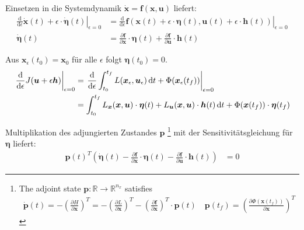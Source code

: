 \documentclass[a4paper, 12pt]{scrartcl}
\newcommand{\dt}{\thinspace \mathrm{d}t}
\begin{document}
Einsetzen in die Systemdynamik $\bm{\dot{x}}=\bm{f}(\bm{x},\bm{u})$ liefert:
%
\begin{align*}
    \left. \frac{\mathrm{d}}{\mathrm{d}\epsilon}
    \bm{\dot{x}}(t) + \epsilon \cdot \bm{\dot{\eta}}(t) \right|_{\epsilon=0}
    &=
    \left.
    \frac{\mathrm{d}}{\mathrm{d}\epsilon}
    \bm{f}
    \left(
        \bm{x}(t) + \epsilon \cdot \bm{\eta}(t),\bm{u}(t) + \epsilon \cdot \bm{h}(t)
    \right)
    \right|_{\epsilon=0}
    \\
    \bm{\dot{\eta}}(t) 
    &=
    \frac{\partial \bm{f}}{\partial \bm{x}} \cdot \bm{\eta}(t) 
    +
    \frac{\partial \bm{f}}{\partial \bm{u}} \cdot \bm{h}(t) 
\end{align*}

Aus $\bm{x}_\epsilon(t_0) = \bm{x}_0$ für alle $\epsilon$ folgt $\bm{\eta}(t_0) = 0$. 
%
\begin{align*}
    \left. 
        \frac{\mathrm{d}}{\mathrm{d}\epsilon} 
        J(\bm{u} + \epsilon \bm{h}) 
    \right|_{\epsilon=0} 
    &= 
    \left.
        \frac{\mathrm{d}}{\mathrm{d}\epsilon} 
        \int_{t_0}^{t_f} L(\bm{x}_\epsilon, \bm{u}_\epsilon) \dt + \Phi(\bm{x}_\epsilon(t_f))
    \right|_{\epsilon=0}
    \\
    &=
    \int_{t_0}^{t_f} L_{\bm{x}}(\bm{x}, \bm{u}) \cdot \bm{\eta}(t)   
    + L_{\bm{u}}(\bm{x}, \bm{u}) \cdot \bm{h}(t) \dt 
    + \Phi(\bm{x}(t_f)) \cdot \bm{\eta}(t_f)
\end{align*}

Multiplikation des adjungierten Zustandes $\bm{p}$
\footnote{
    The adjoint state $\bm{p}:\mathbb{R} \to \mathbb{R}^{n_x}$ satisfies 
    \begin{align*}
        \bm{\dot{p}}(t) 
        = 
        - \left(\frac{\partial H}{\partial \bm{x}}\right)^T 
        = 
        - \left(\frac{\partial L}{\partial \bm{x}}\right)^T 
        - \left(\frac{\partial \bm{f}}{\partial \bm{x}}\right)^T \cdot \bm{p}(t)
        \quad
        \bm{p}(t_f) = \left(\frac{\partial \Phi(\bm{x}(t_f))}{\partial \bm{x}}\right)^T
    \end{align*}
} 
mit der Sensitivitätsgleichung für $\bm{\eta}$ liefert:
%
\begin{align*}
    \bm{p}(t)^T
    \left(
        \bm{\dot{\eta}}(t) 
        -
        \frac{\partial \bm{f}}{\partial \bm{x}} \cdot \bm{\eta}(t) 
        -
        \frac{\partial \bm{f}}{\partial \bm{u}} \cdot \bm{h}(t)
    \right)
    &=
    0
\end{align*}
\end{document}
